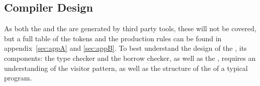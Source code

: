 \subsection{Compiler Design}
\label{sec:CompilerDesign}

As both the \lexer{} and the \parser{} are generated by third party tools, these will
not be covered, but a full table of the tokens and the
production rules can be found in appendix~\ref{sec:appA} and \ref{sec:appB}. To best
understand the design of the \static, its components: the type checker and the borrow
checker, as well as the \codeGen{}, requires an understanding of
the visitor pattern, as well as the structure of the \ast{} of a typical \lang{}
program.








